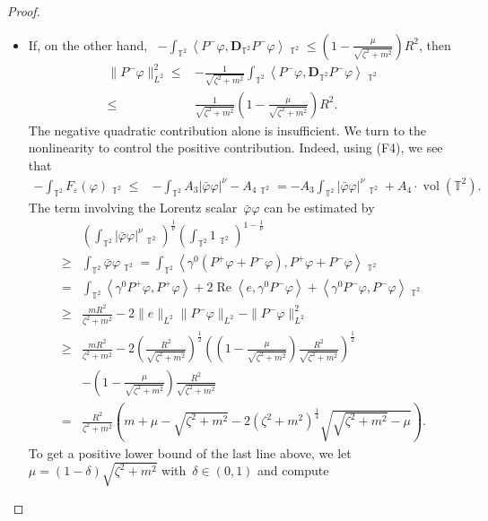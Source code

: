 \documentclass[10pt,a4paper]{amsart}
\newcommand{\T}{\mathbb{T}}
\newcommand{\dd}{\mathop{}\!\mathrm{d}}
\newcommand{\eps}{\varepsilon}
\newcommand{\pD}{\mathbf{D}}
\newcommand{\Abracket}[1]{\left<#1\right>} %
\newcommand{\parenthesis}[1]{\left(#1\right)} %
\DeclareMathOperator{\dv}{\dd{vol}}
\DeclareMathOperator{\vol}{vol}
\begin{document}
\begin{proof}
\begin{itemize}
    \item If, on the other hand, ~$-\int_{\T^2}\Abracket{P^-\varphi,\pD_{\T^2} P^-\varphi}\dv_{\T^2}\leq(1-\frac{\mu}{\sqrt{\zeta^2+m^2}})R^2$, then 
    \begin{align}
    \|P^-\varphi\|_{L^2}^2
    \leq& -\frac{1}{\sqrt{\zeta^2+m^2}} \int_{\T^2} \Abracket{P^-\varphi,\pD_{\T^2} P^-\varphi }\dv_{\T^2} \\
    \leq& \frac{1}{\sqrt{\zeta^2+m^2}}(1-\frac{\mu}{\sqrt{\zeta^2+m^2}})R^2.
    \end{align}
    The negative quadratic contribution alone is insufficient.
    We turn to the nonlinearity to control the positive contribution.
    Indeed, using (F4), we see that
    \begin{align}
    -\int_{\T^2} F_\eps(\varphi)\dv_{\T^2}
    \leq& -\int_{\T^2} A_3 |\bar{\varphi}\varphi|^\nu -A_4 \dv_{\T^2}
    =-A_3\int_{\T^2} |\bar{\varphi}\varphi|^\nu\dv_{\T^2} + A_4 \cdot\vol(\T^2).
    \end{align}
    The term involving the Lorentz scalar~$\bar{\varphi}\varphi$ can be estimated by
    \begin{align}
    &\parenthesis{\int_{\T^2} |\bar{\varphi}\varphi|^\nu\dv_{\T^2} }^{\frac{1}{\nu}}
    \parenthesis{\int_{\T^2} 1 \dv_{\T^2}}^{1-\frac{1}{\nu}}\\
    \geq&  \int_{\T^2} \bar{\varphi}\varphi\dv_{\T^2}
    = \int_{\T^2} \Abracket{\gamma^0\parenthesis{P^+\varphi+ P^-\varphi}, P^+\varphi + P^-\varphi}\dv_{\T^2} \\
    =& \int_{\T^2} \Abracket{\gamma^0 P^+ \varphi, P^+\varphi} + 2\operatorname{Re}\Abracket{ e,\gamma^0P^-\varphi}
    + \Abracket{\gamma^0 P^- \varphi, P^-\varphi}\dv_{\T^2} \\
    \geq & \frac{mR^2}{{\zeta^2+m^2}} -2\|e\|_{L^2}\|P^-\varphi\|_{L^2}-\|P^-\varphi\|_{L^2}^2\\
    \geq&\frac{mR^2}{{\zeta^2+m^2}}-2\parenthesis{\frac{R^2}{\sqrt{\zeta^2+m^2}} }^{\frac{1}{2}}\parenthesis{ \parenthesis{1-\frac{\mu}{\sqrt{\zeta^2+m^2}}}\frac{R^2}{\sqrt{\zeta^2+m^2}}  }^{\frac{1}{2}}  \\
        & -\parenthesis{1-\frac{\mu}{\sqrt{\zeta^2+m^2}}}\frac{R^2}{\sqrt{\zeta^2+m^2}} \\
    =&\frac{R^2}{{\zeta^2+m^2}} \parenthesis{m+\mu-\sqrt{\zeta^2+m^2} -2(\zeta^2+m^2)^{\frac{1}{4}}\sqrt{\sqrt{ \zeta^2+m^2 }  -\mu} }.
\end{align}
To get a positive lower bound of the last line above, we let~$\mu=(1-\delta)\sqrt{\zeta^2+m^2}$ with~$\delta\in(0,1)$ and compute

\end{itemize}
\end{proof}
\end{document}
